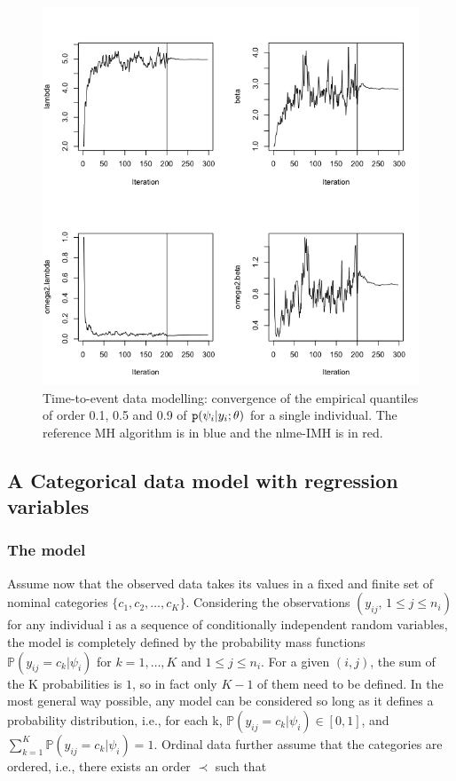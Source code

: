 \begin{figure}[thp]
\begin{center}
\includegraphics[width=\textwidth]{images/popparam_tte.png}
\caption{Time-to-event data modelling: convergence of the empirical quantiles of order 0.1, 0.5 and 0.9 of $\texttt{p}(\psi_i | y_i ; \theta)$ for a single individual. The reference MH algorithm is in blue and the nlme-IMH is in red.}
\label{pop_tte}
\end{center}
\end{figure}

\subsection{A Categorical data model with regression variables}
\subsubsection{The model}

Assume now that the observed data takes its values in a fixed and finite set of nominal categories $\{c_1, c_2,\ldots , c_K\}$. Considering the observations $(y_{ij},\, 1 \leq j \leq n_i)$ for any individual i as a sequence of conditionally independent random variables, the model is completely defined by the probability mass functions $\mathbb{P}(y_{ij}=c_k | \psi_i)$ for $k=1,\ldots, K$ and $1 \leq j \leq n_i$. For a given $(i,j)$, the sum of the K probabilities is $1$, so in fact only $K-1$ of them need to be defined. In the most general way possible, any model can be considered so long as it defines a probability distribution, i.e., for each k, $\mathbb{P}(y_{ij}=c_k | \psi_i) \in [0,1]$, and $\sum_{k=1}^{K} \mathbb{P}(y_{ij}=c_k | \psi_i) =1$. Ordinal data further assume that the categories are ordered, i.e., there exists an order $\prec$ such that

